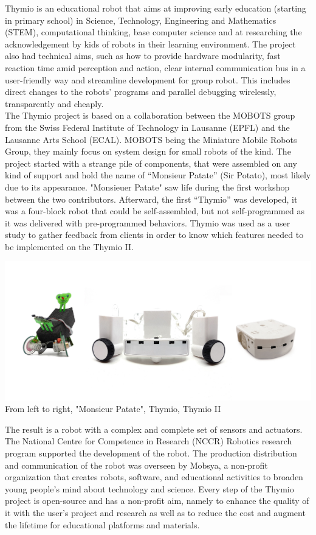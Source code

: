 \documentclass{scrreprt}
\begin{document}
Thymio is an educational robot that aims at improving early education (starting in primary school) in Science, Technology, Engineering and Mathematics (STEM),
computational thinking, base computer science and at researching the acknowledgement by kids of robots in their learning environment.
The project also had technical aims, such as how to provide hardware modularity, fast reaction time amid perception and action,
clear internal communication bus in a user-friendly way and streamline development for group robot. This includes direct changes to the robots’ programs and parallel debugging wirelessly, 
transparently and cheaply.\\

The Thymio project is based on a collaboration between the MOBOTS group from the Swiss Federal Institute of Technology in Lausanne (EPFL) and the Lausanne Arts School (ECAL).
MOBOTS being the Miniature Mobile Robots Group, they mainly focus on system design for small robots of the kind. The project started with a strange pile of components, 
that were assembled on any kind of support and hold the name of “Monsieur Patate” (Sir Potato), most likely due to its appearance. 
"Monsieuer Patate" saw life during the first workshop between the two contributors. Afterward, the first “Thymio” was developed, 
it was a four-block robot that could be self-assembled, but not self-programmed as it was delivered with pre-programmed behaviors. 
Thymio was used as a user study to gather feedback from clients in order to know which features needed to be implemented on the Thymio II.\\

\begin{center}
  \includegraphics[width=\textwidth]{prototype_thymio_old}\\
  From left to right, "Monsieur Patate", Thymio, Thymio II
\end{center}

The result is a robot with a complex and complete set of sensors and actuators. 
The National Centre for Competence in Research (NCCR) Robotics research program supported the development of the robot. The production distribution and communication of the robot was overseen by Mobsya, 
a non-profit organization that creates robots, software, and educational activities to broaden young people's mind about technology and science. 
Every step of the Thymio project is open-source and has a non-profit aim, namely to enhance the quality of it with the user's project and research as well as to reduce the cost and augment the lifetime for educational platforms and materials.
\end{document}
